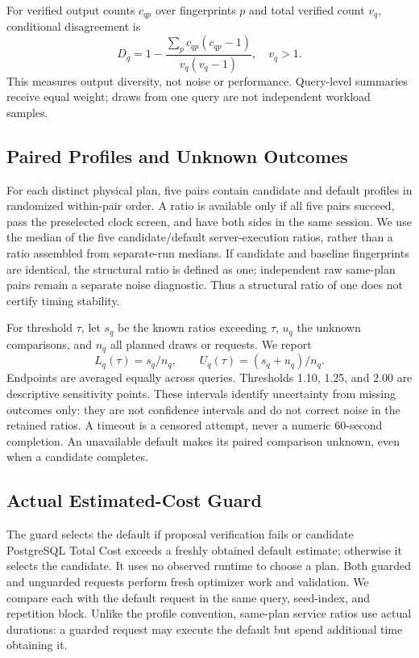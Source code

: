 \documentclass[conference]{IEEEtran}
\begin{document}
For verified output counts $c_{qp}$ over fingerprints $p$ and total verified
count $v_q$, conditional disagreement is
\begin{equation}
D_q=1-\frac{\sum_p c_{qp}(c_{qp}-1)}{v_q(v_q-1)},\quad v_q>1.
\end{equation}
This measures output diversity, not noise or performance. Query-level summaries
receive equal weight; draws from one query are not independent workload samples.

\subsection{Paired Profiles and Unknown Outcomes}
For each distinct physical plan, five pairs contain candidate and default
profiles in randomized within-pair order. A ratio is available only if all five
pairs succeed, pass the preselected clock screen, and have both sides in the
same session. We use the median of the five candidate/default server-execution
ratios, rather than a ratio assembled from separate-run medians. If candidate
and baseline fingerprints are identical, the structural ratio is defined as one;
independent raw same-plan pairs remain a separate noise diagnostic. Thus a
structural ratio of one does not certify timing stability.

For threshold $\tau$, let $s_q$ be the known ratios exceeding $\tau$, $u_q$ the
unknown comparisons, and $n_q$ all planned draws or requests. We report
\begin{equation}
L_q(\tau)=s_q/n_q,\qquad U_q(\tau)=(s_q+u_q)/n_q.
\end{equation}
Endpoints are averaged equally across queries. Thresholds 1.10, 1.25, and 2.00
are descriptive sensitivity points. These intervals identify uncertainty from
missing outcomes only: they are not confidence intervals and do not correct
noise in the retained ratios. A timeout is a censored attempt, never a numeric
60-second completion. An unavailable default makes its paired comparison unknown,
even when a candidate completes.

\subsection{Actual Estimated-Cost Guard}
The guard selects the default if proposal verification fails or candidate
PostgreSQL Total Cost exceeds a freshly obtained default estimate; otherwise it
selects the candidate. It uses no observed runtime to choose a plan. Both guarded
and unguarded requests perform fresh optimizer work and validation. We compare
each with the default request in the same query, seed-index, and repetition block.
Unlike the profile convention, same-plan service ratios use actual durations:
a guarded request may execute the default but spend additional time obtaining it.
\end{document}
